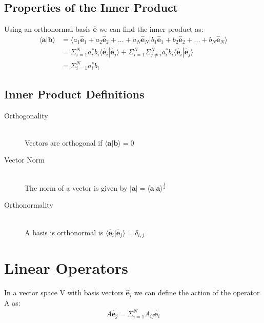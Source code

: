 \documentclass{article}
\begin{document}
\subsection{Properties of the Inner Product}

Using an orthonormal basis $ \hat{\textbf{e}} $ we can find the inner product as:
\begin{align}
	\langle \textbf{a} | \textbf{b} \rangle 	& = \langle a_1 \hat{\textbf{e}}_1 + a_2 \hat{\textbf{e}}_2 + ... + a_N \hat{\textbf{e}}_N |  b_1 \hat{\textbf{e}}_1 + b_2 \hat{\textbf{e}}_2 + ... + b_N \hat{\textbf{e}}_N \rangle \\
								& = \Sigma_{i=1}^{N} a_{i}^{*} b_{i} \langle \hat{\textbf{e}}_i | \hat{\textbf{e}}_j \rangle + \Sigma_{i=1}^{N} \Sigma_{j \neq i}^{N} a_{i}^{*} b_{i} \langle \hat{\textbf{e}}_i | \hat{\textbf{e}}_j \rangle \\
								& = \Sigma_{i=1}^{N} a_{i}^{*} b_{i}
\end{align}

\subsection{Inner Product Definitions}

\begin{description}
  \item[Orthogonality] \hfill \\ Vectors are orthogonal if $ \langle \textbf{a} | \textbf{b} \rangle  = 0 $
  \item[Vector Norm] \hfill \\ The norm of a vector is given by $ | \textbf{a} | = \langle \textbf{a} | \textbf{a} \rangle ^{\frac{1}{2}} $
  \item[Orthonormality] \hfill \\ A basis is orthonormal is $ \langle \hat{\textbf{e}}_i | \hat{\textbf{e}}_j \rangle  = \delta_{i,j} $
\end{description}

\section{Linear Operators}

In a vector space V with basis vectors $ \hat{\textbf{e}}_i $ we can define the action of the operator A as:
\begin{align}
	A \hat{\textbf{e}}_j = \Sigma_{i=1}^N A_{ij} \hat{\textbf{e}}_i
\end{align}
\end{document}
